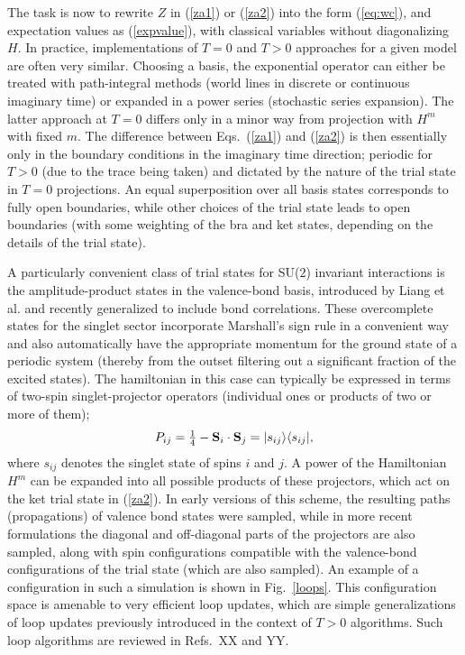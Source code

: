 \documentclass[range]{ar2e}
\begin{document}
The task is now to rewrite $Z$ in (\ref{za1}) or (\ref{za2}) into the form (\ref{eq:wc}), and expectation values as (\ref{expvalue}), with classical 
variables without diagonalizing $H$. In practice, implementations of $T=0$ and $T>0$ approaches for a given model are often very similar. Choosing a 
basis, the exponential operator can either be treated with path-integral methods (world lines in discrete or continuous imaginary time) or expanded 
in a power series (stochastic series expansion). The latter approach at $T=0$ differs only in a minor way from projection with $H^m$ with fixed $m$. The difference 
between Eqs.~(\ref{za1}) and (\ref{za2}) is then essentially only in the boundary conditions in the imaginary time direction; periodic for $T>0$ 
(due to the trace being taken) and dictated by the nature of the trial state in $T=0$ projections. An equal superposition over all basis states 
corresponds to fully open boundaries, while other choices of the trial state leads to open boundaries (with some weighting of the bra and ket 
states, depending on the details of the trial state). 

A particularly convenient class of trial states for SU($2$) invariant interactions is the amplitude-product states in the valence-bond basis, 
introduced by Liang et al. and recently generalized to include bond correlations. These overcomplete states for the singlet sector incorporate
Marshall's sign rule in a convenient way and also automatically have the appropriate momentum for the ground state of a periodic system (thereby
from the outset filtering out a significant fraction of the excited states). The hamiltonian in this case can typically be expressed in terms of 
two-spin singlet-projector operators  (individual ones or products of two or more of them);
\begin{equation}
P_{ij}=\hbox{$\frac{1}{4}$}-{\bf S}_i\cdot {\bf S}_j = |s_{ij}\rangle\langle s_{ij}|,
\label{psinglet}
\end{equation}
where $s_{ij}$ denotes the singlet state of spins $i$ and $j$.
A power of the Hamiltonian $H^m$ can be expanded into all possible products of these projectors, which act on the ket trial state in 
(\ref{za2}). In early versions of this scheme, the resulting paths (propagations) of valence bond states were sampled, while in more 
recent formulations the diagonal and off-diagonal parts of the projectors are also sampled, along with spin configurations compatible with 
the valence-bond configurations of the trial state (which are also sampled).\cite{Sandvik10a} An example of a configuration in such a simulation is shown 
in Fig.~\ref{loops}. This configuration space is amenable to very efficient loop updates, which are simple generalizations of loop updates 
previously introduced in the context of $T>0$ algorithms. Such loop algorithms are reviewed in Refs.~XX and YY.
\end{document}
